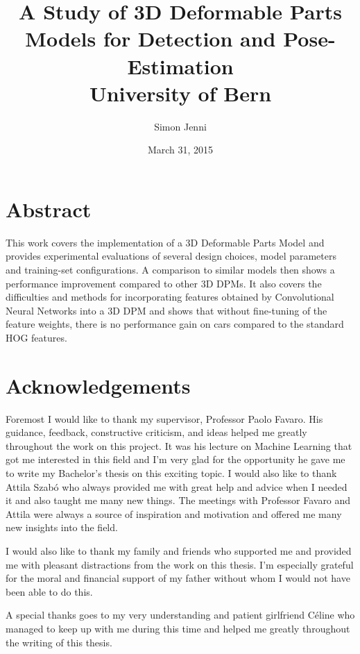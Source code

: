 \documentclass[12pt]{report}
\title{
	{A Study of 3D Deformable Parts Models for Detection and Pose-Estimation}\\
	{\large University of Bern}\\
}
\author{Simon Jenni}
\date{March 31, 2015}
\begin{document}
\maketitle

\chapter*{Abstract}
This work covers the implementation of a 3D Deformable Parts Model and provides experimental evaluations of several design choices, model parameters and training-set configurations. A comparison to similar models then shows a performance improvement compared to other 3D DPMs. It also covers the difficulties and methods for incorporating features obtained by Convolutional Neural Networks into a 3D DPM and shows that without fine-tuning of the feature weights, there is no performance gain on cars compared to the standard HOG features.

%
%
\chapter*{Acknowledgements}
Foremost I would like to thank my supervisor, Professor Paolo Favaro. His guidance, feedback, constructive criticism, and ideas helped me greatly throughout the work on this project. It was his lecture on Machine Learning that got me interested in this field and I'm very glad for the opportunity he gave me to write my Bachelor's thesis on this exciting topic. I would also like to thank Attila Szab\'{o} who always provided me with great help and advice when I needed it and also taught me many new things. The meetings with Professor Favaro and Attila were always a source of inspiration and motivation and offered me many new insights into the field.

I would also like to thank my family and friends who supported me and provided me with  pleasant distractions from the work on this thesis. I'm especially grateful for the moral and financial support of my father without whom I would not have been able to do this.

A special thanks goes to my very understanding and patient girlfriend C\'{e}line who managed to keep up with me during this time and helped me greatly throughout the writing of this thesis. 
\end{document}
